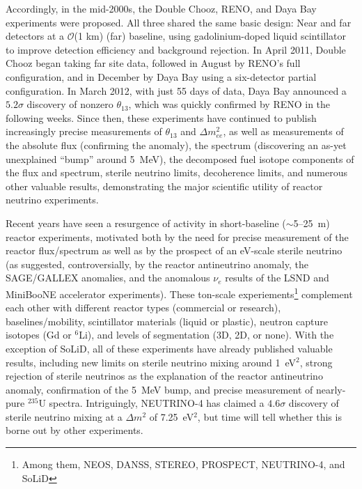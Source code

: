 \documentclass[../thesis.tex]{subfiles}
\begin{document}
Accordingly, in the mid-2000s, the Double Chooz, RENO, and Daya Bay experiments
were proposed. All three shared the same basic design: Near and far detectors at
a $\mathcal{O}$(1 km) (far) baseline, using gadolinium-doped liquid scintillator
to improve detection efficiency and background rejection. In April 2011, Double
Chooz began taking far site data, followed in August by RENO's full
configuration, and in December by Daya Bay using a six-detector partial
configuration. In March 2012, with just 55 days of data, Daya Bay announced a
$5.2\sigma$ discovery of nonzero $\theta_{13}$, which was quickly confirmed by
RENO in the following weeks. Since then, these experiments have continued to
publish increasingly precise measurements of $\theta_{13}$ and $\Delta
m^2_{ee}$, as well as measurements of the absolute flux (confirming the
anomaly), the spectrum (discovering an as-yet unexplained ``bump'' around
5~MeV), the decomposed fuel isotope components of the flux and spectrum, sterile
neutrino limits, decoherence limits, and numerous other valuable results,
demonstrating the major scientific utility of reactor neutrino experiments.

Recent years have seen a resurgence of activity in short-baseline
($\sim$5--25~m) reactor experiments, motivated both by the need for precise
measurement of the reactor flux/spectrum as well as by the prospect of an
eV-scale sterile neutrino (as suggested, controversially, by the reactor
antineutrino anomaly, the SAGE/GALLEX anomalies, and the anomalous $\nu_e$
results of the LSND and MiniBooNE accelerator experiments). These ton-scale
experiements\footnote{Among them, NEOS, DANSS, STEREO, PROSPECT, NEUTRINO-4, and
  SoLiD} complement each other with different reactor types (commercial or
research), baselines/mobility, scintillator materials (liquid or plastic),
neutron capture isotopes (Gd or $^6$Li), and levels of segmentation (3D, 2D, or
none). With the exception of SoLiD, all of these experiments have already
published valuable results, including new limits on sterile neutrino mixing
around 1~eV$^2$, strong rejection of sterile neutrinos as the explanation of the
reactor antineutrino anomaly, confirmation of the 5~MeV bump, and precise
measurement of nearly-pure $^{235}$U spectra. Intriguingly, NEUTRINO-4 has
claimed a $4.6\sigma$ discovery of sterile neutrino mixing at a $\Delta m^2$ of
7.25~eV$^2$, but time will tell whether this is borne out by other experiments.
\end{document}

